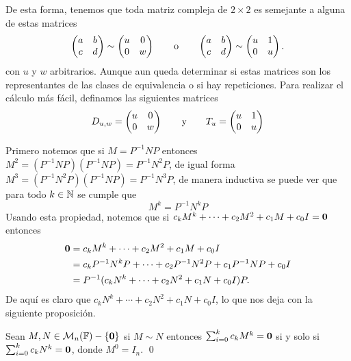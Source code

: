 De esta forma, tenemos que toda matriz compleja de $2 \times 2$ es semejante a alguna de estas matrices
\begin{equation}
  \begin{pmatrix} a & b \\ c & d \end{pmatrix} \sim \begin{pmatrix} u & 0 \\ 0 & w \end{pmatrix}
    \qquad\text{o}\qquad
    \begin{pmatrix} a & b \\ c & d \end{pmatrix} \sim \begin{pmatrix} u & 1 \\ 0 & u \end{pmatrix}.
      \label{eq:M2Form}
\end{equation}
con $u$ y $w$ arbitrarios. Aunque aun queda determinar si estas matrices son los representantes de las clases de equivalencia o si hay repeticiones. Para realizar el cálculo más fácil, definamos las siguientes matrices 
\[
  D_{u,w} = \begin{pmatrix} u & 0 \\ 0 & w \end{pmatrix}
     \qquad\text{y}\qquad
  T_u = \begin{pmatrix} u & 1 \\ 0 & u \end{pmatrix}
\]

Primero notemos que si $M = P^{-1} N P$ entonces $M^2 = (P^{-1} N P)(P^{-1} N P) = P^{-1}N^2 P$, de igual forma $M^3 = (P^{-1}N^2 P) (P^{-1} N P) = P^{-1}N^3 P$, de manera inductiva se puede ver que para todo $k \in \mathbb{N}$ se cumple que
\[
  M^k = P^{-1} N^k P
\]
Usando esta propiedad, notemos que si $c_k M^k + \cdots + c_2 M^2 + c_1 M + c_0 I = \mathbf{0}$ entonces
\begin{align*}
  \mathbf{0} &= c_k M^k + \cdots + c_2 M^2 + c_1 M + c_0 I \\
    &= c_k P^{-1}N^k P + \cdots + c_2 P^{-1}N^2 P + c_1 P^{-1}N P + c_0 I \\
    &= P^{-1} (c_k N^k + \cdots + c_2 N^2 + c_1 N + c_0 I) P.
\end{align*}
De aquí es claro que $c_k N^k + \cdots + c_2 N^2 + c_1 N + c_0 I$, lo que nos deja con la siguiente proposición.

\begin{prop} \label{prop:MPolySem}
  Sean $M, N \in \mathcal{M}_n(\mathbb{F}) - \{\mathbf{0}\}$ si $M \sim N$ entonces $\sum_{i=0}^k c_k M^k = \mathbf{0}$ si y solo si $\sum_{i=0}^k c_k N^k = \mathbf{0}$, donde $M^0 = I_n$. \qed
\end{prop}

